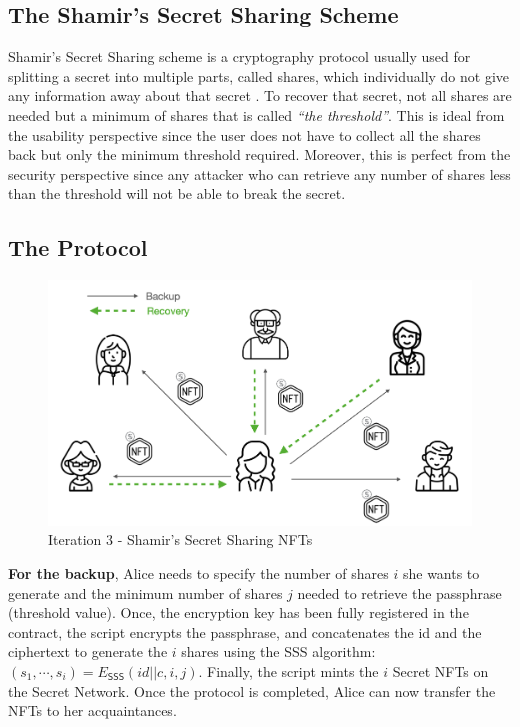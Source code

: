 \documentclass[runningheads]{llncs}
\newcommand{\ms}[1]{\ensuremath{\mathsf{#1}}}
\begin{document}
\subsection{The Shamir's Secret Sharing Scheme}

Shamir's Secret Sharing scheme is a cryptography protocol usually used for splitting a secret into multiple parts, called shares, which individually do not give any information away about that secret \cite{shamir1979share}. To recover that secret, not all shares are needed but a minimum of shares that is called {\em ``the threshold''}. This is ideal from the usability perspective since the user does not have to collect all the shares back but only the minimum threshold required. Moreover, this is perfect from the security perspective since any attacker who can retrieve any number of shares less than the threshold will not be able to break the secret. \\

\subsection{The Protocol}

\begin{figure}[t]
  \includegraphics[width=\linewidth]{./media/media-005.png}
  \caption{Iteration 3 - Shamir's Secret Sharing NFTs}
  \label{it3:backup}
\end{figure}

{\bf For the backup}, Alice needs to specify the number of shares $i$ she wants to generate and the minimum number of shares $j$ needed to retrieve the passphrase (threshold value). Once, the encryption key has been fully registered in the contract, the script encrypts the passphrase, and concatenates the id and the ciphertext to generate the $i$ shares using the SSS algorithm: $(s_1,\cdots,s_i)=E_{\ms{SSS}}(id||c, i, j)$. Finally, the script mints the $i$ Secret NFTs on the Secret Network. Once the protocol is completed, Alice can now transfer the NFTs to her acquaintances. \\
\end{document}

